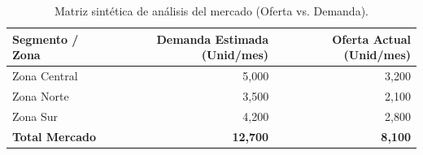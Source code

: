 \begin{table}[htbp]
    \centering
    \caption{Matriz sintética de análisis del mercado (Oferta vs. Demanda).}
    \label{tab:estudio_mercado}
    \begin{tabular}{lrr}
        \toprule
        \textbf{Segmento / Zona} & \textbf{Demanda Estimada (Unid/mes)} & \textbf{Oferta Actual (Unid/mes)} \\
        \midrule
        Zona Central            & 5,000 & 3,200 \\
        Zona Norte              & 3,500 & 2,100 \\
        Zona Sur                & 4,200 & 2,800 \\
        \midrule
        \textbf{Total Mercado}  & \textbf{12,700} & \textbf{8,100} \\
        \bottomrule
    \end{tabular}
\end{table}
